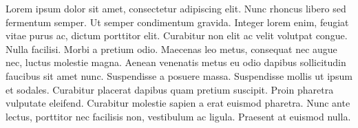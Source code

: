 \label{sec:abstract}

Lorem ipsum dolor sit amet, consectetur adipiscing elit. Nunc rhoncus libero sed fermentum semper. Ut semper condimentum gravida. Integer lorem enim, feugiat vitae purus ac, dictum porttitor elit. Curabitur non elit ac velit volutpat congue. Nulla facilisi. Morbi a pretium odio. Maecenas leo metus, consequat nec augue nec, luctus molestie magna. Aenean venenatis metus eu odio dapibus sollicitudin faucibus sit amet nunc. Suspendisse a posuere massa. Suspendisse mollis ut ipsum et sodales. Curabitur placerat dapibus quam pretium suscipit. Proin pharetra vulputate eleifend. Curabitur molestie sapien a erat euismod pharetra. Nunc ante lectus, porttitor nec facilisis non, vestibulum ac ligula. Praesent at euismod nulla.
